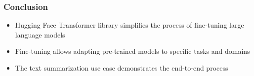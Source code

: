 \begin{frame}[fragile]\frametitle{Conclusion}
  \begin{itemize}
    \item Hugging Face Transformer library simplifies the process of fine-tuning large language models
    \item Fine-tuning allows adapting pre-trained models to specific tasks and domains
    \item The text summarization use case demonstrates the end-to-end process
  \end{itemize}
\end{frame}
